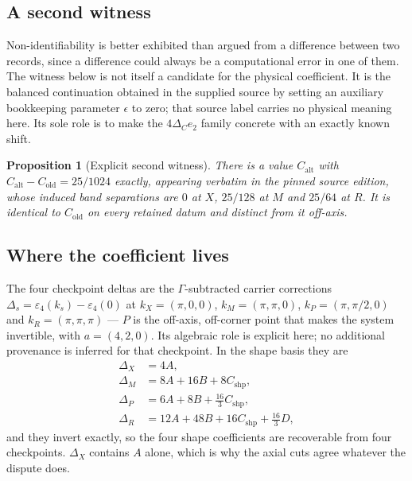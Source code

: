 \documentclass[11pt]{article}
\theoremstyle{plain}
\newtheorem{proposition}[theorem]{Proposition}
\theoremstyle{definition}
\theoremstyle{remark}
\newcommand{\chk}[1]{}
\begin{document}
\subsection{A second witness}

Non-identifiability is better exhibited than argued from a difference between
two records, since a difference could always be a computational error in one of
them. The witness below is not itself a candidate for the physical
coefficient. It is the balanced continuation obtained in the supplied source
by setting an auxiliary bookkeeping parameter $\epsilon$ to zero; that source
label carries no physical meaning here. Its sole role is to make the
$4\Delta_Ce_2$ family concrete with an exactly known shift.

\begin{proposition}[Explicit second witness]\label{prop:witness}
There is a value $C_{\mathrm{alt}}$ with
$C_{\mathrm{alt}}-C_{\mathrm{old}}=25/1024$ exactly, appearing verbatim in the
pinned source edition, whose induced band separations are $0$ at $X$,
$25/128$ at $M$ and $25/64$ at $R$. It is identical to
$C_{\mathrm{old}}$ on every retained datum and distinct from it off-axis.
\end{proposition}
\chk{FINDING: an explicit second witness C\_alt exhibits the C2 non-identifiability}
\chk{the C\_alt witness IS the balanced eps-free continuation, and Delta\_C/(A/2) = 15/32}

\subsection{Where the coefficient lives}

The four checkpoint deltas are the $\Gamma$-subtracted carrier corrections
$\Delta_s=\varepsilon_4(k_s)-\varepsilon_4(0)$ at
$k_X=(\pi,0,0)$, $k_M=(\pi,\pi,0)$, $k_P=(\pi,\pi/2,0)$ and
$k_R=(\pi,\pi,\pi)$ --- $P$ is the off-axis, off-corner point that makes the
system invertible, with $a=(4,2,0)$. Its algebraic role is explicit here; no
additional provenance is inferred for that checkpoint. In the shape basis they are
\begin{equation}\label{eq:checkpoints}
\begin{aligned}
  \Delta_X&=4A,\\
  \Delta_M&=8A+16B+8C_{\mathrm{shp}},\\
  \Delta_P&=6A+8B+\tfrac{16}3C_{\mathrm{shp}},\\
  \Delta_R&=12A+48B+16C_{\mathrm{shp}}+\tfrac{16}3D,
\end{aligned}
\end{equation}
and they invert exactly, so the four shape coefficients are recoverable from
four checkpoints. $\Delta_X$ contains $A$ alone, which is why the axial cuts
agree whatever the dispute does.
\chk{checkpoint values at X, M, P, R}
\chk{the four extraction formulas invert the ansatz}
\chk{X is blind to B, C, D — it fixes A alone}
\end{document}
